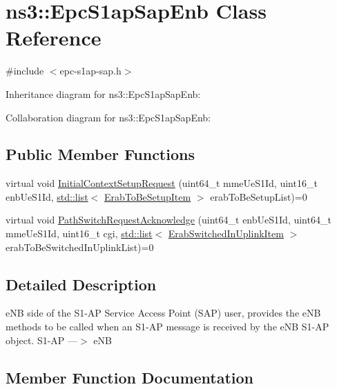 \hypertarget{classns3_1_1EpcS1apSapEnb}{}\section{ns3\+:\+:Epc\+S1ap\+Sap\+Enb Class Reference}
\label{classns3_1_1EpcS1apSapEnb}


{\ttfamily \#include $<$epc-\/s1ap-\/sap.\+h$>$}



Inheritance diagram for ns3\+:\+:Epc\+S1ap\+Sap\+Enb\+:


Collaboration diagram for ns3\+:\+:Epc\+S1ap\+Sap\+Enb\+:
\subsection*{Public Member Functions}
\begin{DoxyCompactItemize}
\item 
virtual void \hyperlink{classns3_1_1EpcS1apSapEnb_accce076a97c96f48445de059c302e0ad}{Initial\+Context\+Setup\+Request} (uint64\+\_\+t mme\+Ue\+S1\+Id, uint16\+\_\+t enb\+Ue\+S1\+Id, \hyperlink{openflow-interface_8h_afd9bcfa176617760671b67580f536fa7}{std\+::list}$<$ \hyperlink{structns3_1_1EpcS1apSap_1_1ErabToBeSetupItem}{Erab\+To\+Be\+Setup\+Item} $>$ erab\+To\+Be\+Setup\+List)=0
\item 
virtual void \hyperlink{classns3_1_1EpcS1apSapEnb_ac6404c7ddd81aea79890976d11cbe005}{Path\+Switch\+Request\+Acknowledge} (uint64\+\_\+t enb\+Ue\+S1\+Id, uint64\+\_\+t mme\+Ue\+S1\+Id, uint16\+\_\+t cgi, \hyperlink{openflow-interface_8h_afd9bcfa176617760671b67580f536fa7}{std\+::list}$<$ \hyperlink{structns3_1_1EpcS1apSap_1_1ErabSwitchedInUplinkItem}{Erab\+Switched\+In\+Uplink\+Item} $>$ erab\+To\+Be\+Switched\+In\+Uplink\+List)=0
\end{DoxyCompactItemize}


\subsection{Detailed Description}
e\+NB side of the S1-\/\+AP Service Access Point (S\+AP) user, provides the e\+NB methods to be called when an S1-\/\+AP message is received by the e\+NB S1-\/\+AP object. S1-\/\+AP ---$>$ e\+NB 

\subsection{Member Function Documentation}
